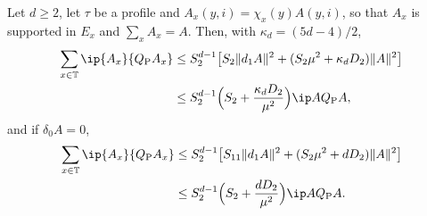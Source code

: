 \begin{lemma}\label{lem:ffprocadecomp}
Let $d\ge2$, let $\tau$ be a profile and $A_x(y,i)=\chi_x(y)A(y,i)$, so that
$A_x$ is supported in $E_x$ and $\sum_xA_x=A$. Then, with $\kappa_d=(5d-4)/2$,
\begin{align*}
\sum_{x\in\mathbb T}\ip{A_x}{Q_{\rm P}A_x}&\le S_2^{d-1}\bigl[S_2\lVert d_1A
\rVert^2+(S_2\mu^2+\kappa_dD_2)\lVert A\rVert^2\bigr]\\
&\le S_2^{d-1}\Bigl(S_2+\frac{\kappa_dD_2}{\mu^2}\Bigr)\ip A{Q_{\rm P}A},
\end{align*}
and if $\delta_0A=0$,
\begin{align*}
\sum_{x\in\mathbb T}\ip{A_x}{Q_{\rm P}A_x}&\le S_2^{d-1}\bigl[S_{11}\lVert d_1A
\rVert^2+(S_2\mu^2+dD_2)\lVert A\rVert^2\bigr]\\
&\le S_2^{d-1}\Bigl(S_2+\frac{dD_2}{\mu^2}\Bigr)\ip A{Q_{\rm P}A}.
\end{align*}
\end{lemma}

